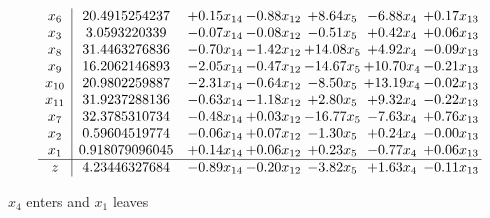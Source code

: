 \documentclass[9pt]{article}
\begin{document}
 \[\begin{array}{c| c c@{\hskip 2pt} c@{\hskip 2pt} c@{\hskip 2pt} c@{\hskip 2pt} c@{\hskip 2pt} }
 x_{6}   &  20.4915254237 & +  0.15 x_{14} & -0.88 x_{12} & +  8.64 x_{5} & -6.88 x_{4} & +  0.17 x_{13}\\
 x_{3}   &  3.0593220339 & -0.07 x_{14} & -0.08 x_{12} & -0.51 x_{5} & +  0.42 x_{4} & +  0.06 x_{13}\\
 x_{8}   &  31.4463276836 & -0.70 x_{14} & -1.42 x_{12} & + 14.08 x_{5} & +  4.92 x_{4} & -0.09 x_{13}\\
 x_{9}   &  16.2062146893 & -2.05 x_{14} & -0.47 x_{12} & -14.67 x_{5} & + 10.70 x_{4} & -0.21 x_{13}\\
 x_{10}   &  20.9802259887 & -2.31 x_{14} & -0.64 x_{12} & -8.50 x_{5} & + 13.19 x_{4} & -0.02 x_{13}\\
 x_{11}   &  31.9237288136 & -0.63 x_{14} & -1.18 x_{12} & +  2.80 x_{5} & +  9.32 x_{4} & -0.22 x_{13}\\
 x_{7}   &  32.3785310734 & -0.48 x_{14} & +  0.03 x_{12} & -16.77 x_{5} & -7.63 x_{4} & +  0.76 x_{13}\\
 x_{2}   &  0.59604519774 & -0.06 x_{14} & +  0.07 x_{12} & -1.30 x_{5} & +  0.24 x_{4} & -0.00 x_{13}\\
 x_{1}   &  0.918079096045 & +  0.14 x_{14} & +  0.06 x_{12} & +  0.23 x_{5} & -0.77 x_{4} & +  0.06 x_{13}\\
\hline
z    &  4.23446327684 & -0.89 x_{14} & -0.20 x_{12} & -3.82 x_{5} & +  1.63 x_{4} & -0.11 x_{13}\\
\end{array}\]


 $ x_{4} $ enters and $ x_{1} $ leaves 
\end{document}
